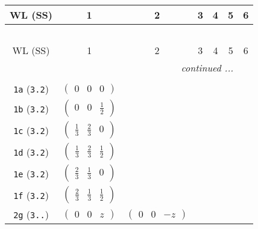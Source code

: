 \documentclass[fleqn,9pt,landscape]{jsarticle}
\begin{document}
\begin{center}
\renewcommand{\arraystretch}{1.2}
\begin{longtable}{ccccccc}
 \hline \hline
WL (SS) & 1 & 2 & 3 & 4 & 5 & 6 \\ \hline \endfirsthead

\multicolumn{6}{l}{\tablename\ \thetable{}} \\
 \hline \hline
WL (SS) & 1 & 2 & 3 & 4 & 5 & 6 \\ \hline \endhead

 \hline \hline
\multicolumn{6}{r}{\footnotesize\it continued ...} \\ \endfoot

 \hline \hline
\multicolumn{6}{r}{} \\ \endlastfoot

{\tt 1a} ({\tt 3.2}) & $ \begin{pmatrix} 0 & 0 & 0 \end{pmatrix} $ & $  $ & $  $ & $  $ & $  $ & $  $ \\ \hline
{\tt 1b} ({\tt 3.2}) & $ \begin{pmatrix} 0 & 0 & \frac{1}{2} \end{pmatrix} $ & $  $ & $  $ & $  $ & $  $ & $  $ \\ \hline
{\tt 1c} ({\tt 3.2}) & $ \begin{pmatrix} \frac{1}{3} & \frac{2}{3} & 0 \end{pmatrix} $ & $  $ & $  $ & $  $ & $  $ & $  $ \\ \hline
{\tt 1d} ({\tt 3.2}) & $ \begin{pmatrix} \frac{1}{3} & \frac{2}{3} & \frac{1}{2} \end{pmatrix} $ & $  $ & $  $ & $  $ & $  $ & $  $ \\ \hline
{\tt 1e} ({\tt 3.2}) & $ \begin{pmatrix} \frac{2}{3} & \frac{1}{3} & 0 \end{pmatrix} $ & $  $ & $  $ & $  $ & $  $ & $  $ \\ \hline
{\tt 1f} ({\tt 3.2}) & $ \begin{pmatrix} \frac{2}{3} & \frac{1}{3} & \frac{1}{2} \end{pmatrix} $ & $  $ & $  $ & $  $ & $  $ & $  $ \\ \hline
{\tt 2g} ({\tt 3..}) & $ \begin{pmatrix} 0 & 0 & z \end{pmatrix} $ & $ \begin{pmatrix} 0 & 0 & - z \end{pmatrix} $ & $  $ & $  $ & $  $ & $  $ \\ \hline

\end{longtable}
\end{center}
\end{document}
